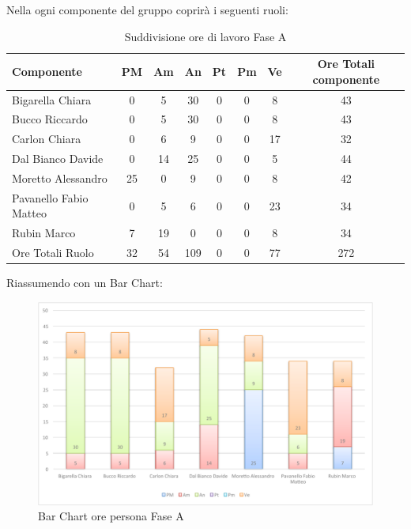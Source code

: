 				Nella  ogni componente del gruppo \groupname{} coprirà i seguenti ruoli:
				\begin{table}[H]
					\begin{center}
						\begin{tabular}{| l | c | c | c | c | c | c | c |}
							\hline
							Componente 				& PM	& Am 	& An 	& Pt 		& Pm 	& Ve 	& Ore Totali componente \\ \hline
							
							Bigarella Chiara 			& 0		& 5 		& 30 		& 0		& 0		& 8 		& 43 \\
							Bucco Riccardo 				& 0		& 5 		& 30 		& 0		& 0		& 8 		& 43 \\
							Carlon Chiara	 			& 0		& 6 		& 9 		& 0		& 0		& 17 		& 32 \\
							Dal Bianco Davide 			& 0		& 14 		& 25 		& 0		& 0		& 5 		& 44 \\
							Moretto Alessandro 			& 25 	& 0			& 9 		& 0		& 0		& 8 		& 42 \\
							Pavanello Fabio Matteo	 	& 0		& 5 		& 6 		& 0		& 0		& 23 		& 34 \\
							Rubin Marco					& 7 	& 19 		& 0			& 0		& 0		& 8 		& 34 \\ \hline \hline
							
							Ore Totali Ruolo 			& 32 	& 54 		& 109 		& 0		& 0		& 77 		& 272\\ \hline
						\end{tabular}
					\end{center}
					\caption{Suddivisione ore di lavoro Fase A}
				\end{table}
				Riassumendo con un Bar Chart:
				\begin{figure}[H]\centering
					\includegraphics[width=\textwidth]{PianoDiProgetto/Pics/ChartOreFaseA.pdf}
					\caption{Bar Chart ore persona Fase A}
				\end{figure}
